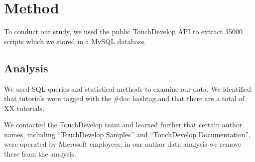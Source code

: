 \section{Method}

To conduct our study, we used the public TouchDevelop API to extract 35000 scripts which we stored in a MySQL database.

\subsection{Analysis}

We used SQL queries and statistical methods to examine our data. We identified that tutorials were tagged with the \#doc hashtag and that there are a total of XX tutorials.

We contacted the TouchDevelop team and learned further that certain author names, including ``TouchDevelop Samples'' and ``TouchDevelop Documentation'', were operated by Microsoft employees; in our author data analysis we remove these from the analysis. 